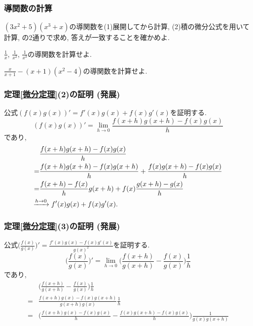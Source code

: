 \begin{frame}
\frametitle{導関数の計算}


\begin{Prob}
$(3x^2+5)(x^3+x)$の導関数を(1)展開してから計算, (2)積の微分公式を用いて計算, の2通りで求め, 答えが一致することを確かめよ. 
\end{Prob}


\begin{Prob}
$\frac{1}{x}$, $\frac{1}{x^2}$, $\frac{1}{x^3}$の導関数を計算せよ. 
\end{Prob}

\begin{Prob}
$\frac{x}{x+1}-(x+1)(x^2-4)$の導関数を計算せよ. 
\end{Prob}


\end{frame}




\begin{frame}
\frametitle{定理\ref{微分定理}(2)の証明 (発展)}

公式$(f(x)g(x))'=f'(x)g(x)+f(x)g'(x)$を証明する. 
$$
(f(x)g(x))' = \lim_{h \to 0} \frac{f(x+h)g(x+h)-f(x)g(x)}{h}
$$
であり, 
\begin{align*}
& \frac{f(x+h)g(x+h)-f(x)g(x)}{h} \\
=& 
\frac{f(x+h)g(x+h)-f(x)g(x+h)}{h}
+
\frac{f(x)g(x+h)-f(x)g(x)}{h} \\
=& 
\frac{f(x+h)-f(x)}{h}g(x+h)
+
f(x)\frac{g(x+h)-g(x)}{h} \\
& \hspace{-4mm} \xrightarrow{h \to 0} 
f'(x)g(x)+f(x)g'(x). 
\end{align*}

\end{frame}





\begin{frame}
\frametitle{定理\ref{微分定理}(3)の証明 (発展)}

公式$\Big(\frac{f(x)}{g(x)}\Big)'=\frac{f'(x)g(x)-f(x)g'(x)}{g(x)^2}$を証明する. 
$$
\Big(\frac{f(x)}{g(x)}\Big)'= \lim_{h \to 0} \Big(\frac{f(x+h)}{g(x+h)} - \frac{f(x)}{g(x)}\Big) \frac{1}{h}
$$
であり, 
\begin{align*}
&\Big(\frac{f(x+h)}{g(x+h)} - \frac{f(x)}{g(x)}\Big) \frac{1}{h} \\
=& 
\frac{f(x+h)g(x)-f(x)g(x+h)}{g(x+h)g(x)} \frac{1}{h} \\
=& 
\Big(
\frac{f(x+h)g(x)-f(x)g(x)}{h}- \frac{f(x)g(x+h)-f(x)g(x)}{h}
\Big) \frac{1}{g(x)g(x+h)}
\end{align*}

\end{frame}


